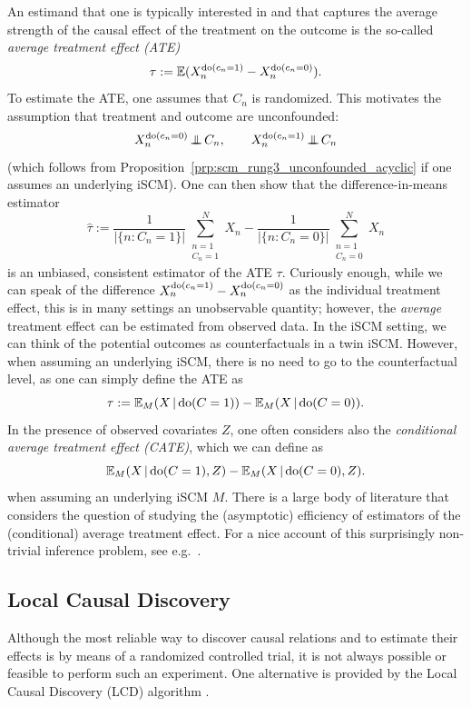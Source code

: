 An estimand that one is typically interested in and that captures the average strength
of the causal effect of the treatment on the outcome is the so-called
\emph{average treatment effect (ATE)}
$$\tau := \mathbb{E}(X_n^{\operatorname{do}(c_n=1)} - X_n^{\operatorname{do}(c_n=0)}).$$
To estimate the ATE, one assumes that $C_n$ is randomized. This motivates the assumption
that treatment and outcome are unconfounded:
$$X_n^{\operatorname{do}(c_n=0)} \operatorname*{\perp\mkern-11mu\perp} C_n, \qquad X_n^{\operatorname{do}(c_n=1)} \operatorname*{\perp\mkern-11mu\perp} C_n$$
(which follows from Proposition~\ref{prp:scm_rung3_unconfounded_acyclic} if one assumes an underlying iSCM).
One can then show that the difference-in-means estimator 
$$\hat{\tau} := \frac{1}{|\{n : C_n=1\}|} \sum_{\substack{n=1 \\ C_n=1}}^N X_n - \frac{1}{|\{n : C_n=0\}|} \sum_{\substack{n=1 \\ C_n=0}}^N X_n$$
is an unbiased, consistent estimator of the ATE $\tau$.
Curiously enough, while we can speak of the difference
$X_n^{\operatorname{do}(c_n=1)} - X_n^{\operatorname{do}(c_n=0)}$ as the individual treatment effect,
this is in many settings an unobservable quantity; however, the \emph{average} treatment effect can 
be estimated from observed data. In the iSCM setting, we can think of the potential
outcomes as counterfactuals in a twin iSCM. However, when assuming an underlying iSCM,
there is no need to go to the counterfactual level, as one can simply define the
ATE as
$$\tau := \mathbb{E}_{M}(X \operatorname*{|} \operatorname{do}(C=1)) - \mathbb{E}_{M}(X \operatorname*{|} \operatorname{do}(C=0)).$$
In the presence of observed covariates $Z$, one often considers also the \emph{conditional
average treatment effect (CATE)}, which we can define as
$$\mathbb{E}_{M}(X \operatorname*{|} \operatorname{do}(C=1),Z) - \mathbb{E}_{M}(X \operatorname*{|} \operatorname{do}(C=0),Z).$$
when assuming an underlying iSCM $M$. There is a large body of literature that considers the
question of studying the (asymptotic) efficiency of estimators of the (conditional)
average treatment effect. For a nice account of this surprisingly non-trivial inference problem, 
see e.g.\ \cite{Wager2020}.


\subsection{Local Causal Discovery}
Although the most reliable way to discover causal relations and to estimate their effects
is by means of a randomized controlled trial, it is not always possible or feasible to 
perform such an experiment. One alternative is provided by the Local Causal Discovery
(LCD) algorithm \cite{Cooper1997}.

